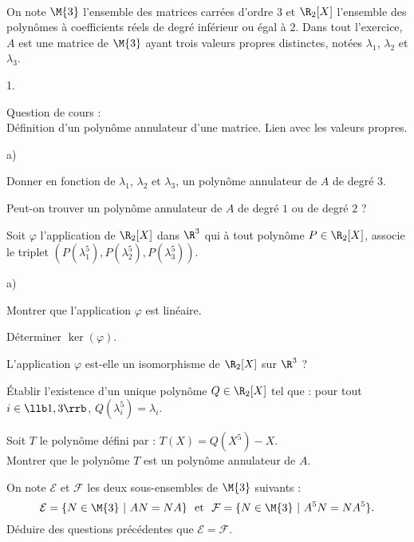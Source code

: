 \documentclass[11pt]{article}%
\begin{document}
\begin{exerciceAP}~\\
  On note $\M{3}$ l'ensemble des matrices carrées d'ordre $3$ et
  $\R_2[X]$ l'ensemble des polynômes à coefficients réels de degré
  inférieur ou égal à $2$. Dans tout l'exercice, $A$ est une matrice
  de $\M{3}$ ayant trois valeurs propres distinctes, notées
  $\lambda_1$, $\lambda_2$ et $\lambda_3$.
  \begin{noliste}{1.}
    \setlength{\itemsep}{2mm}
  \item Question de cours :\\
    Définition d'un polynôme annulateur d'une matrice. Lien avec les
    valeurs propres.
  \item
    \begin{noliste}{a)}
    \setlength{\itemsep}{2mm}
    \item Donner en fonction de $\lambda_1$, $\lambda_2$ et
      $\lambda_3$, un polynôme annulateur de $A$ de degré $3$.
    \item Peut-on trouver un polynôme annulateur de $A$ de degré $1$
      ou de degré $2$ ?
    \end{noliste}

  \item Soit $\varphi$ l'application de $\R_2[X]$ dans $\R^3$ qui à
    tout polynôme $P\in\R_2[X]$, associe le triplet
    $\left(P(\lambda_1^5),P(\lambda_2^5), P(\lambda_3^5)\right)$.
    \begin{noliste}{a)}
    \setlength{\itemsep}{2mm}
    \item Montrer que l'application $\varphi$ est linéaire.
    \item Déterminer $\ker(\varphi)$.
    \item L'application $\varphi$ est-elle un isomorphisme de
      $\R_2[X]$ sur $\R^3$ ?
    \item Établir l'existence d'un unique polynôme $Q\in\R_2[X]$ tel
      que : pour tout $i\in\llb1,3\rrb$, $Q(\lambda_i^5)=\lambda_i$.
    \item Soit $T$ le polynôme défini par : $T(X)=Q(X^5)-X$.\\
      Montrer que le polynôme $T$ est un polynôme annulateur de $A$.
    \end{noliste}

  \item On note $\mathcal{E}$ et $\mathcal{F}$ les deux sous-ensembles
    de $\M{3}$ suivants :
    \[
    \mathcal{E} = \{N\in\M{3} \ | \ AN = NA\} \ \mbox{ et } \
    \mathcal{F} = \{N\in\M{3} \ | \ A^5N = NA^5\}.
    \]
    Déduire des questions précédentes que $\mathcal{E}=\mathcal{F}$.
  \end{noliste}
\end{exerciceAP}
\end{document}

